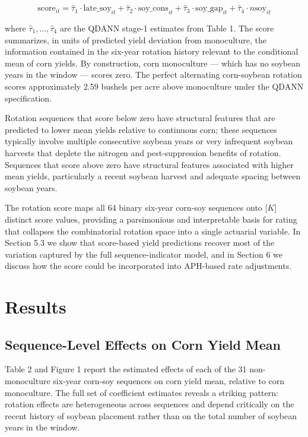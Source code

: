 \documentclass[12pt,letterpaper]{article}
\theoremstyle{remark}
\theoremstyle{plain}
\theoremstyle{definition}
\begin{document}
\begin{equation}
    \text{score}_{it} = \hat{\tau}_1 \cdot \text{late\_soy}_{it} + \hat{\tau}_2 \cdot \text{soy\_cons}_{it} + \hat{\tau}_3 \cdot \text{soy\_gap}_{it} + \hat{\tau}_4 \cdot n\text{soy}_{it}
\end{equation}

where $\hat{\tau}_1, \ldots, \hat{\tau}_4$ are the QDANN stage-1 estimates from Table 1. The score summarizes, in units of predicted yield deviation from monoculture, the information contained in the six-year rotation history relevant to the conditional mean of corn yields. By construction, corn monoculture — which has no soybean years in the window — scores zero. The perfect alternating corn-soybean rotation scores approximately 2.59 bushels per acre above monoculture under the QDANN specification.

Rotation sequences that score below zero have structural features that are predicted to lower mean yields relative to continuous corn; these sequences typically involve multiple consecutive soybean years or very infrequent soybean harvests that deplete
the nitrogen and pest-suppression benefits of rotation. Sequences that score above zero have structural features associated with higher mean yields, particularly a recent soybean harvest and adequate spacing between soybean years.

The rotation score maps all 64 binary six-year corn-soy sequences onto [$K$] distinct score values, providing a parsimonious and interpretable basis for rating that collapses the combinatorial rotation space into a single actuarial variable. In Section 5.3 we
show that score-based yield predictions recover most of the variation captured by the full sequence-indicator model, and in Section 6 we discuss how the score could be incorporated into APH-based rate adjustments.

\section{\label{sec:results}Results}
\subsection{\label{subsec:seq_effects}Sequence-Level Effects on Corn Yield Mean}

Table 2 and Figure 1 report the estimated effects of each of the 31 non-monoculture six-year corn-soy sequences on corn yield mean, relative to corn monoculture. The full set of coefficient estimates reveals a striking pattern: rotation effects are heterogeneous across sequences and depend critically on the recent history of soybean placement rather than on the total number of soybean years in the window.
\end{document}
